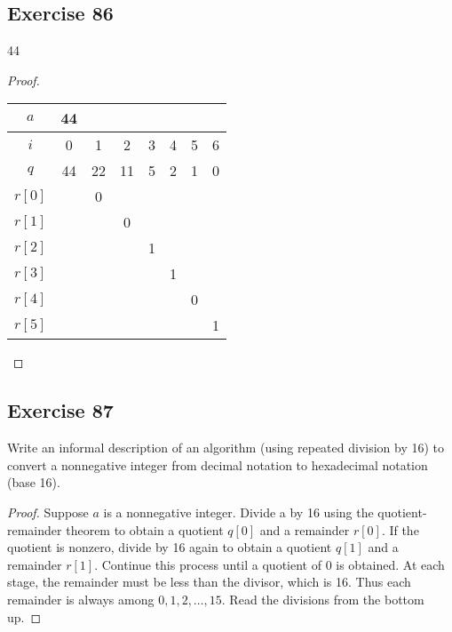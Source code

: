 \documentclass[14pt]{extarticle}
\begin{document}
\subsection{Exercise 86}
44
\begin{proof}
    \begin{center}
        \begin{tabular}{|c|c|c|c|c|c|c|c|}
            \hline
            $a$    & 44 &    &    &   &   &   &   \\
            \hline
            $i$    & 0  & 1  & 2  & 3 & 4 & 5 & 6 \\
            \hline
            $q$    & 44 & 22 & 11 & 5 & 2 & 1 & 0 \\
            \hline
            $r[0]$ &    & 0  &    &   &   &   &   \\
            \hline
            $r[1]$ &    &    & 0  &   &   &   &   \\
            \hline
            $r[2]$ &    &    &    & 1 &   &   &   \\
            \hline
            $r[3]$ &    &    &    &   & 1 &   &   \\
            \hline
            $r[4]$ &    &    &    &   &   & 0 &   \\
            \hline
            $r[5]$ &    &    &    &   &   &   & 1 \\
            \hline
        \end{tabular}
    \end{center}
\end{proof}

\subsection{Exercise 87}
Write an informal description of an algorithm (using repeated division by 16) to convert a nonnegative integer from decimal notation to hexadecimal notation (base 16).

\begin{proof}
    Suppose $a$ is a nonnegative integer. Divide a by 16 using the quotient-remainder theorem to obtain a quotient $q[0]$ and a remainder $r[0]$. If the quotient is nonzero, divide by 16 again to obtain a quotient $q[1]$ and a remainder $r[1]$. Continue this process until a quotient of 0 is obtained. At each stage, the remainder must be less than the divisor, which is 16. Thus each remainder is always among $0, 1, 2, \ldots, 15$. Read the divisions from the bottom up.
\end{proof}
\end{document}
